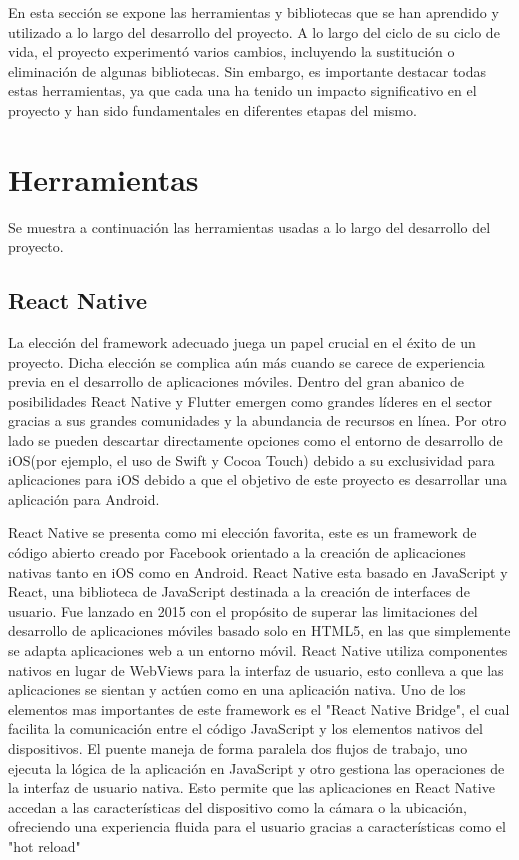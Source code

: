 
En esta sección se expone las herramientas y bibliotecas que se han aprendido y utilizado a lo largo del desarrollo del proyecto.
A lo largo del ciclo de su ciclo de vida, el proyecto experimentó varios cambios, incluyendo la sustitución o eliminación de algunas bibliotecas. Sin embargo, es importante destacar todas estas herramientas, ya que cada una ha tenido un impacto significativo en el proyecto y han sido fundamentales en diferentes etapas del mismo.

\section{Herramientas}

Se muestra a continuación las herramientas usadas a lo largo del desarrollo del proyecto.

\subsection{React Native}

La elección del framework adecuado juega un papel crucial en el éxito de un proyecto. Dicha elección se complica aún más cuando se carece de experiencia previa en el desarrollo de aplicaciones móviles. Dentro del gran abanico de posibilidades React Native y Flutter emergen como grandes líderes en el sector gracias a sus grandes comunidades y la abundancia de recursos en línea. Por otro lado se pueden descartar directamente opciones como el entorno de desarrollo de iOS(por ejemplo, el uso de Swift y Cocoa Touch) debido a su exclusividad para aplicaciones para iOS debido a que el objetivo de este proyecto es desarrollar una aplicación para Android.

React Native se presenta como mi elección favorita, este es un framework de código abierto creado por Facebook orientado a la creación de aplicaciones nativas tanto en iOS como en Android. React Native esta basado en JavaScript y React, una biblioteca de JavaScript destinada a la creación de interfaces de usuario. Fue lanzado en 2015 con el propósito de superar las limitaciones del desarrollo de aplicaciones móviles basado solo en HTML5, en las que simplemente se adapta aplicaciones web a un entorno móvil. React Native utiliza componentes nativos en lugar de WebViews para la interfaz de usuario, esto conlleva a que las aplicaciones se sientan y actúen como en una aplicación nativa.
Uno de los elementos mas importantes de este framework es el "React Native Bridge", el cual facilita la comunicación entre el código JavaScript y los elementos nativos del dispositivos. El puente maneja de forma paralela dos flujos de trabajo, uno ejecuta la lógica de la aplicación en JavaScript y otro gestiona las operaciones de la interfaz de usuario nativa. Esto permite que las aplicaciones en React Native accedan a las características del dispositivo como la cámara o la ubicación, ofreciendo una experiencia fluida para el usuario gracias a características como el "hot reload"

